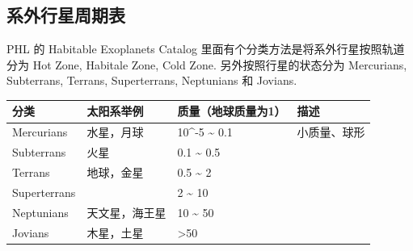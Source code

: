 \documentclass[letterpaper,10pt,english]{sphinxmanual}
\begin{document}
\subsection{系外行星周期表}
\label{viscat:id2}\label{viscat:index-0}
PHL 的 Habitable Exoplanets Catalog 里面有个分类方法是将系外行星按照轨道分为 Hot Zone, Habitale Zone, Cold Zone. 另外按照行星的状态分为 Mercurians, Subterrans, Terrans, Superterrans, Neptunians 和 Jovians.

\begin{tabulary}{\linewidth}{|L|L|L|L|}
\hline

分类
 & 
太阳系举例
 & 
质量（地球质量为1）
 & 
描述
\\
\hline
Mercurians
 & 
水星，月球
 & 
10\textasciicircum{}-5 \textasciitilde{} 0.1
 & 
小质量、球形
\\
\hline
Subterrans
 & 
火星
 & 
0.1 \textasciitilde{} 0.5
 & \\
\hline
Terrans
 & 
地球，金星
 & 
0.5 \textasciitilde{} 2
 & \\
\hline
Superterrans
 &  & 
2 \textasciitilde{} 10
 & \\
\hline
Neptunians
 & 
天文星，海王星
 & 
10 \textasciitilde{} 50
 & \\
\hline
Jovians
 & 
木星，土星
 & 
\textgreater{}50
 & \\
\hline\end{tabulary}
\end{document}
